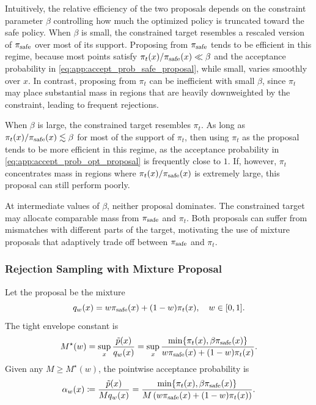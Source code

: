 Intuitively, the relative efficiency of the two proposals depends on the constraint parameter $\beta$ controlling how much the optimized policy is truncated toward the safe policy. When $\beta$ is small, the constrained target resembles a rescaled version of $\pi_{\rm safe}$ over most of its support. Proposing from $\pi_{\rm safe}$ tends to be efficient in this regime, because most points satisfy $\pi_t(x)/\pi_{\rm safe}(x) \ll \beta$ and the acceptance probability in \autoref{eq:app:accept_prob_safe_proposal}, while small, varies smoothly over $x$. In contrast, proposing from $\pi_t$ can be inefficient with small $\beta$, since $\pi_t$ may place substantial mass in regions that are heavily downweighted by the constraint, leading to frequent rejections.


When $\beta$ is large, the constrained target resembles $\pi_t$. As long as $\pi_t(x) / \pi_{\rm safe}(x) \lesssim \beta$ for most of the support of $\pi_t$, then using $\pi_t$ as the proposal tends to be more efficient in this regime, as the acceptance probability in \autoref{eq:app:accept_prob_opt_proposal} is frequently close to $1$. If, however, $\pi_t$ concentrates mass in regions where $\pi_t(x) / \pi_{\rm safe}(x)$ is extremely large, this proposal can still perform poorly.


At intermediate values of $\beta$, neither proposal dominates. The constrained target may allocate comparable mass from $\pi_{\rm safe}$ and $\pi_t$. Both proposals can suffer from mismatches with different parts of the target, motivating the use of mixture proposals that adaptively trade off between $\pi_{\rm safe}$ and $\pi_t$.

\subsubsection{Rejection Sampling with Mixture Proposal}
\label{app:rejection_mixture}

Let the proposal be the mixture
$$
q_w(x) = w \pi_{\rm safe}(x) + (1-w) \pi_t(x),
\quad w \in [0, 1].
$$
The tight envelope constant is
$$
M^\star(w) = \sup_x \frac{\tilde p(x)}{q_w(x)}
=
\sup_x \frac{\min\{\pi_t(x), \beta \pi_{\rm safe}(x)\}}{w \pi_{\rm safe}(x) + (1-w) \pi_t(x)}.
$$
Given any $M\ge M^\star(w)$, the pointwise acceptance probability is
\begin{equation}
\alpha_w(x) \coloneqq \frac{\tilde p(x)}{M q_w(x)}
= \frac{\min\{\pi_t(x), \beta \pi_{\rm safe}(x)\}}{M\left(w \pi_{\rm safe}(x)+(1-w) \pi_t(x) \right)}.
\label{eq:app:accept_prob_mixture}
\end{equation}

